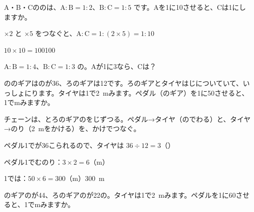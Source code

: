 \begin{reidai}
A・B・Cののは、$\mathrm{A}:\mathrm{B}=1:2$、$\mathrm{B}:\mathrm{C}=1:5$ です。Aを1に10させると、Cは1にしますか。\par
\kangaekata $\times2$ と $\times5$ をつなぐと、$\mathrm{A}:\mathrm{C}=1:(2\times5)=1:10$\par
\shiki $10\times10=100$\kotaenext\mbox{100}
\end{reidai}

\begin{jibun}
$\mathrm{A}:\mathrm{B}=1:4$、$\mathrm{B}:\mathrm{C}=1:3$ の。Aが1に3なら、Cは？
\end{jibun}

\begin{reidai}[\R{歯}{は}の\R{数}{かず}から\R{回転}{かい|てん}を\R{求}{もと}めてつなぐ]
ののギアはのが36、ろのギアは12です。ろのギアとタイヤはじについていて、いっしょにります。タイヤは1で\qty{2}{m}みます。ペダル（のギア）を1に50させると、1でmみますか。\par
\kangaekata チェーンは、とろのギアのをじずつる。ペダル→タイヤ（のでわる）と、タイヤ→のり（\qty{2}{m}をかける）を、かけでつなぐ。\par
\shiki ペダル1でが36こられるので、タイヤは $36\div12=3$（）\par
\hspace*{2.6\zw}ペダル1でむのり：$3\times2=6$（m）\par
\hspace*{2.6\zw}1では：$50\times6=300$（m）\kotaenext\qty{300}{m}
\end{reidai}

\begin{jibun}
のギアのが44、ろのギアのが22の。タイヤは1で\qty{2}{m}みます。ペダルを1に60させると、1でmみますか。
\end{jibun}

